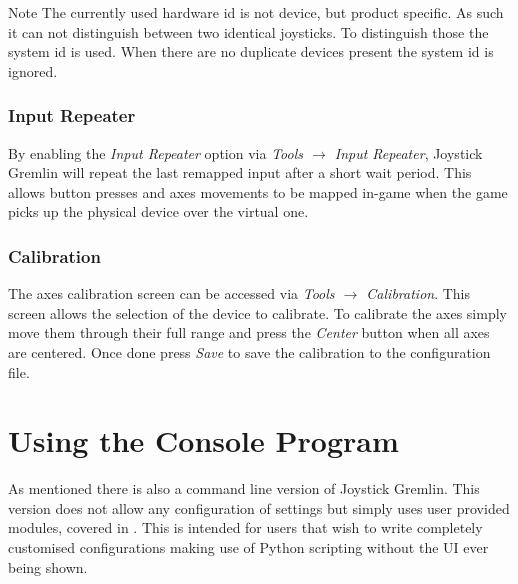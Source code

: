 \documentclass[a4, 10pt]{article}
\newcommand{\JG}{Joystick Gremlin}
\begin{document}
\vspace{1em}
\begin{bclogo}[
    couleur=yellow!40,
    couleurBord=orange!80,
    couleurBarre=orange!80,
    arrondi=0.1,
    logo=\bcinfo
]{Note}
    The currently used hardware id is not device, but product specific.
    As such it can not distinguish between two identical joysticks. To
    distinguish those the system id is used. When there are no duplicate
    devices present the system id is ignored.
\end{bclogo}


\subsubsection{Input Repeater}

By enabling the \emph{Input Repeater} option via \emph{Tools
$\rightarrow$ Input Repeater}, \JG{} will repeat the last remapped input
after a short wait period. This allows button presses and axes movements
to be mapped in-game when the game picks up the physical device over the
virtual one.


\subsubsection{Calibration}

The axes calibration screen can be accessed via \emph{Tools
$\rightarrow$ Calibration}. This screen allows the selection of the
device to calibrate. To calibrate the axes simply move them through
their full range and press the \emph{Center} button when all axes are
centered. Once done press \emph{Save} to save the calibration to the
configuration file.



\section{Using the Console Program}
\label{sec:console}

As mentioned there is also a command line version of \JG{}. This
version does not allow any configuration of settings but simply uses
user provided modules, covered in . This is
intended for users that wish to write completely customised
configurations making use of Python scripting without the UI ever being
shown.
\end{document}
